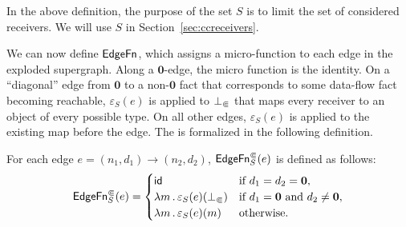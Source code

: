 In the above definition, the purpose of the set $S$ is to limit the set of considered receivers. We will use $S$ in Section~\ref{sec:ccreceivers}.


%

We can now define $\textsf{EdgeFn}$, which assigns a micro-function to each edge in
the exploded supergraph. 
Along a $\mathbf0$-edge, the micro function is the identity. 
On a ``diagonal'' edge from $\mathbf0$ to a non-$\mathbf0$ fact that corresponds
to some data-flow fact becoming reachable, $\varepsilon_S(e)$ is applied to
$\bot_\Subset$ that maps every receiver to an object of every possible type.
On all other edges, $\varepsilon_S(e)$ is applied to the existing map before the edge.
The is formalized in the following definition.
\begin{definition}\label{def:edgefn}
For each edge $e = (n_1,d_1) \to (n_2,d_2)$, $\textsf{EdgeFn}^\Subset_{S}(e)$ is defined as follows:
  \begin{equation}\label{eq:edgefndef}
      \textsf{EdgeFn}^\Subset_{S}(e)=
        \begin{cases}
          \textsf{id}  &\text{if $d_1=d_2=\mathbf0$},\\
          \lambda m\,.\,\varepsilon_S(e)(\bot_\Subset) &\text{if $d_1=\mathbf0$ and $d_2\ne\mathbf0$},\\
          \lambda m\,.\,\varepsilon_S(e)(m)  &\text{otherwise.}
        \end{cases}
  \end{equation}
\end{definition}


